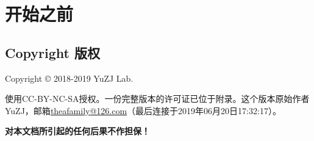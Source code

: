 \chapter{开始之前}
\section{Copyright 版权}
Copyright \copyright{} 2018-2019 YuZJ Lab. \par
使用CC-BY-NC-SA授权。一份完整版本的许可证已位于附录。这个版本原始作者YuZJ，邮箱\url{theafamily@126.com}（最后连接于2019年06月20日17:32:17）。
\begin{center}\large \bf {\color{red}对本文档所引起的任何后果不作担保！}\normalall\end{center}
